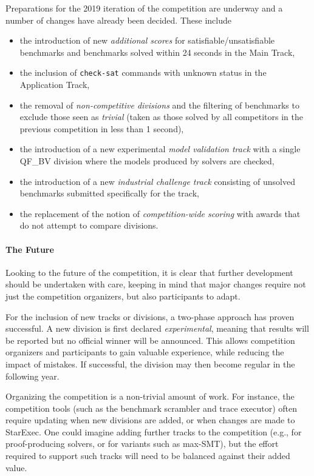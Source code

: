 \documentclass[dvipsnames,table,twoside,11pt]{article}
\newcommand{\maintrack}{Main Track\xspace}
\newcommand{\apptrack}{Application Track\xspace}
\begin{document}
Preparations for the 2019 iteration of the competition are underway and a number of changes have already been decided. These include

\begin{itemize}
  \item the introduction of new \emph{additional scores} for
    satisfiable/unsatisfiable benchmarks and benchmarks solved within 24
    seconds in the \maintrack,
	\item the inclusion of {\tt check-sat} commands with unknown status in
  the \apptrack,
  \item the removal of \emph{non-competitive divisions} and the filtering of
    benchmarks to exclude those seen as \emph{trivial} (taken as those solved
    by all competitors in the previous competition in less than 1 second),
  \item the introduction of a new experimental \emph{model validation track}
    with a single QF\_BV division where the models produced by solvers are
    checked,
  \item the introduction of a new \emph{industrial challenge track} consisting
    of unsolved benchmarks submitted specifically for the track,
  \item the replacement of the notion of \emph{competition-wide scoring} with
    awards that do not attempt to compare divisions.
\end{itemize}



\paragraph{The Future}

Looking to the future of the competition, it is clear that further development should be undertaken with care,
keeping in mind that major changes require not just the competition
organizers, but also participants to adapt.  

For the inclusion of new tracks or divisions, a two-phase approach has
proven successful.  A new division is first declared
\emph{experimental}, meaning that results will be reported but no
official winner will be announced.  This allows competition organizers
and participants to gain valuable experience, while reducing the
impact of mistakes.  If successful, the division may then become
regular in the following year.

Organizing the competition is a non-trivial amount of work.  For
instance, the competition tools (such as the benchmark scrambler and
trace executor) often require updating when new divisions are added,
or when changes are made to StarExec.  One could imagine adding
further tracks to the competition (e.g., for proof-producing solvers,
or for variants such as max-SMT), but the effort required to support
such tracks will need to be balanced against their added value.
\end{document}
